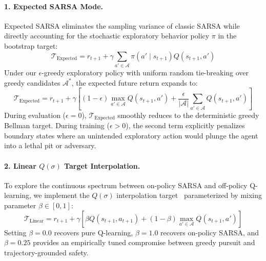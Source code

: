 \paragraph{1. Expected SARSA Mode.}
Expected SARSA eliminates the sampling variance of classic SARSA while directly accounting for the stochastic exploratory behavior policy $\pi$ in the bootstrap target:
\begin{equation}
\label{eq:expected_sarsa}
\mathcal{T}_{\text{Expected}} = r_{t+1} + \gamma \sum_{a' \in \mathcal{A}} \pi(a' \mid s_{t+1}) Q(s_{t+1}, a')
\end{equation}
Under our $\epsilon$-greedy exploratory policy with uniform random tie-breaking over greedy candidates $\mathcal{A}^*$, the expected future return expands to:
\begin{equation}
\mathcal{T}_{\text{Expected}} = r_{t+1} + \gamma \left[ (1 - \epsilon) \max_{a' \in \mathcal{A}} Q(s_{t+1}, a') + \frac{\epsilon}{|\mathcal{A}|} \sum_{a' \in \mathcal{A}} Q(s_{t+1}, a') \right]
\end{equation}
During evaluation ($\epsilon = 0$), $\mathcal{T}_{\text{Expected}}$ smoothly reduces to the deterministic greedy Bellman target. During training ($\epsilon > 0$), the second term explicitly penalizes boundary states where an unintended exploratory action would plunge the agent into a lethal pit or adversary.

\paragraph{2. Linear $Q(\sigma)$ Target Interpolation.}
To explore the continuous spectrum between on-policy SARSA and off-policy Q-learning, we implement the $Q(\sigma)$ interpolation target~\cite{de2018multi} parameterized by mixing parameter $\beta \in [0, 1]$:
\begin{equation}
\label{eq:linear_q_sarsa}
\mathcal{T}_{\text{Linear}} = r_{t+1} + \gamma \left[ \beta Q(s_{t+1}, a_{t+1}) + (1 - \beta) \max_{a' \in \mathcal{A}} Q(s_{t+1}, a') \right]
\end{equation}
Setting $\beta = 0.0$ recovers pure Q-learning, $\beta = 1.0$ recovers on-policy SARSA, and $\beta = 0.25$ provides an empirically tuned compromise between greedy pursuit and trajectory-grounded safety.

